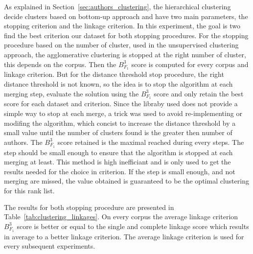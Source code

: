 As explained in Section~\ref{sec:authors_clustering}, the hierarchical clustering decide clusters based on bottom-up approach and have two main parameters, the stopping criterion and the linkage criterion.
In this experiment, the goal is two find the best criterion our dataset for both stopping procedures.
For the stopping procedure based on the number of cluster, used in the unsupervised clustering approach, the agglomerative clustering is stopped at the right number of cluster, this depends on the corpus.
Then the $B^3_{F_1}$ score is computed for every corpus and linkage criterion.
But for the distance threshold stop procedure, the right distance threshold is not known, so the idea is to stop the algorithm at each merging step, evaluate the solution using the $B^3_{F_1}$ score and only retain the best score for each dataset and criterion.
Since the libraby used does not provide a simple way to stop at each merge, a trick was used to avoid re-implementing or modifing the algorithm, which concist to increase the distance threshold by a small value until the number of clusters found is the greater then number of authors.
The $B^3_{F_1}$ score retained is the maximal reached during every steps.
The step should be small enough to ensure that the algorithm is stopped at each merging at least.
This method is high inefficiant and is only used to get the results needed for the choice in criterion.
If the step is small enough, and not merging are missed, the value obtained is guaranteed to be the optimal clustering for this rank list.

The results for both stopping procedure are presented in Table~\ref{tab:clustering_linkages}.
On every corpus the average linkage criterion $B^3_{F_1}$ score is better or equal to the single and complete linkage score which results in  average to a better linkage criterion.
The average linkage criterion is used for every subsequent experiments.

